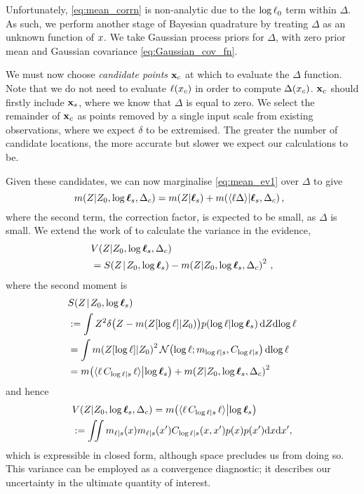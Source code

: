 \documentclass{article}
\begin{document}
Unfortunately, \eqref{eq:mean_corrn} is non-analytic due to the $\tr_0$ term within $\Delta$. As such, we perform another stage of Bayesian quadrature by treating $\Delta$ as an unknown function of $\lfv$. We take Gaussian process priors for $\Delta$, with zero prior mean and Gaussian covariance \eqref{eq:Gaussian_cov_fn}.

 We must now choose \emph{candidate points} $\vlfv_c$ at which to evaluate the $\Delta$ function. 
Note that we do not need to evaluate $\lfn(\lfv_c)$ in order to compute $\Delta(\lfv_c)$.
$\vlfv_c$ should firstly include $\vlfv_s$, where we know that $\Delta$ is equal to zero. We select the remainder of $\vlfv_c$  as points removed by a single input scale from existing observations, where we expect $\delta$ to be extremised. The greater the number of candidate locations, the more accurate but slower we expect our calculations to be.

Given these candidates, we can now marginalise \eqref{eq:mean_ev1} over $\Delta$ to give
\begin{equation} \label{eq:post_mean}
 \hspace{-0.2cm}\mean{\If}{Z_0,\tvr_s,\Delta_c} =
\mean{\If}{\vr_s} + \mean{\inty{\lfn \Delta}}{\vr_s, \Delta_c},
\end{equation}
where the second term, the correction factor, is expected to be small, as $\Delta$ is small. We extend the work of \citet{BQR} to calculate the variance in the evidence,
\begin{align} 
& \cov{\If}{Z_0,\tvr_s,\Delta_c}\nonumber\\ 
& = \secm{\If}{Z_0,\tvr_s} - \mean{\If}{Z_0,\tvr_s,\Delta_c}^2\,,
\end{align}
where the second moment is 
\begin{align}
& \secm{\If}{Z_0,\tvr_s}  \nonumber\\
& \deq \int Z^2 
\delta\bigl(Z - \mean{Z[\tr]}{Z_0}\bigr)
\p{\tr}{\tvr_s}
\ud Z \ud\tr
\nonumber\\
& = \int \mean{Z[\tr]}{Z_0}^2
\N{\tr}{\meancondfn{\tr}{s}}{C_{\tr|s}}
 \ud\tr
\nonumber\\
& = \mean{\inty{\lfn\,C_{\tr|s}\,\lfn}}{\tvr_s}+
\mean{\If}{Z_0,\tvr_s,\Delta_c}^2
\end{align}
and hence 
\begin{align} \label{eq:post_var}
  &\cov{\If}{Z_0,\tvr_s,\Delta_c} = \mean{\inty{\lfn\,C_{\tr|s}\,\lfn}}{\tvr_s} 
\nonumber\\ 
&\deq
 \iint m_{\lfn|s}(\lfv) m_{\lfn|s}(\lfv') C_{\tr|s}(\lfv,\lfv')  p(x) p(x') \ud \lfv \ud\lfv',
\end{align}
which is expressible in closed form, although space precludes us from doing so. This variance can be employed as a convergence diagnostic; it describes our uncertainty in the ultimate quantity of interest.
\end{document}
